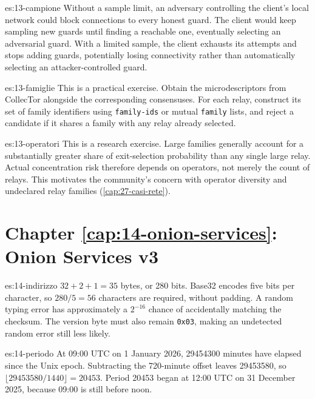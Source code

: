 \begin{soluzione}{es:13-campione}
Without a sample limit, an adversary controlling the client's local network could block connections to every honest guard. The client would keep sampling new guards until finding a reachable one, eventually selecting an adversarial guard. With a limited sample, the client exhausts its attempts and stops adding guards, potentially losing connectivity rather than automatically selecting an attacker-controlled guard.
\end{soluzione}

\begin{soluzione}{es:13-famiglie}
This is a practical exercise. Obtain the microdescriptors from CollecTor alongside the corresponding consensuses. For each relay, construct its set of family identifiers using \texttt{family-ids} or mutual \texttt{family} lists, and reject a candidate if it shares a family with any relay already selected.
\end{soluzione}

\begin{soluzione}{es:13-operatori}
This is a research exercise. Large families generally account for a substantially greater share of exit-selection probability than any single large relay. Actual concentration risk therefore depends on operators, not merely the count of relays. This motivates the community's concern with operator diversity and undeclared relay families (\cref{cap:27-casi-rete}).
\end{soluzione}

\section*{Chapter \ref{cap:14-onion-services}: Onion Services v3}

\begin{soluzione}{es:14-indirizzo}
$32 + 2 + 1 = 35$ bytes, or 280 bits. Base32 encodes five bits per character, so $280/5 = 56$ characters are required, without padding. A random typing error has approximately a $2^{-16}$ chance of accidentally matching the checksum. The version byte must also remain \texttt{0x03}, making an undetected random error still less likely.
\end{soluzione}

\begin{soluzione}{es:14-periodo}
At 09:00 UTC on 1 January 2026, \num{29454300} minutes have elapsed since the Unix epoch. Subtracting the 720-minute offset leaves \num{29453580}, so $\lfloor 29453580 / 1440 \rfloor = 20453$. Period \num{20453} began at 12:00 UTC on 31 December 2025, because 09:00 is still before noon.
\end{soluzione}

